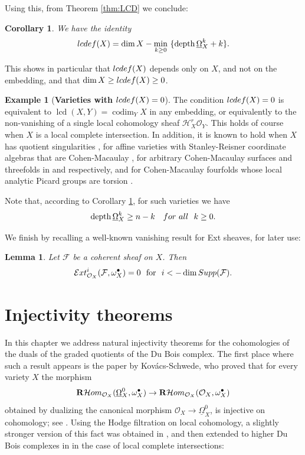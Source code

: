 \documentclass[11pt]{amsart}
\newtheorem{lemma}[equation]{Lemma}
\newtheorem{corollary}[equation]{Corollary}
\theoremstyle{definition}
\newtheorem{example}[equation]{Example}
\theoremstyle{plain}
\newcommand{\E}{\mathcal E}
\newcommand{\F}{\mathcal F}
\renewcommand{\H}{\mathcal H}
\renewcommand{\O}{\mathcal O}
\newcommand{\RHom}{{\bf R} \H om}
\newcommand{\sExt}{\E xt} %
\newcommand{\DB}{\underline{\Omega}} %
\DeclareMathOperator{\lcd}{lcd}
\DeclareMathOperator{\codim}{codim}
\DeclareMathOperator{\depth}{depth}
\begin{document}
Using this, from Theorem \ref{thm:LCD} we conclude:

\begin{corollary}\label{cor:depth-DB-complex}
We have the identity 
$${\rm lcdef} (X) = \dim X -  \underset{k \ge 0}{\min}~ \{ \depth \DB_X^k + k \}.$$
\end{corollary}

This shows in particular that ${\rm lcdef} (X)$ depends only on $X$, and not on the embedding, and that 
 $\dim X \ge {\rm lcdef} (X) \ge 0$.


\begin{example}[{\bf Varieties with ${\rm lcdef}(X)= 0$}]\label{def=0}
The condition ${\rm lcdef}(X)= 0$ is equivalent to $\lcd (X, Y) = \codim_Y X$ in any embedding, or equivalently to the non-vanishing of a single 
local cohomology sheaf $\H^r_X \O_Y$. This holds of course when $X$ is a local complete intersection. In addition, it is known to hold 
when $X$ has quotient singularities \cite[Corollary 11.22]{MP-LC}, for affine varieties with Stanley-Reisner coordinate algebras that are Cohen-Macaulay \cite[Corollary 11.26]{MP-LC}, for arbitrary Cohen-Macaulay surfaces and threefolds in \cite[Remark p.338-339]{Ogus} and 
\cite[Corollary 2.8]{DT} respectively, and for Cohen-Macaulay fourfolds whose local analytic Picard groups are torsion \cite[Theorem 1.3]{DT}.  

Note that, according to Corollary \ref{cor:depth-DB-complex}, for such varieties we have
$$ \depth \DB_X^k \ge n- k \,\,\,\,\,\,{\rm for ~all}\,\,\,\, k \ge 0.$$
\end{example}

\smallskip

We finish  by recalling a well-known vanishing result for Ext sheaves, for later use:

\begin{lemma}\label{lem:vanishing-of-Ext}
Let $\F$ be a coherent sheaf on $X$. Then 
\[\sExt^i_{\O_X}(\F, \omega_X^{\bullet})=0 \text{ \,\,{\rm for} \,\,} i< -\dim {\rm Supp}( \F).\]
\end{lemma}




\section{Injectivity theorems}
In this chapter we address natural injectivity theorems for the cohomologies of the duals of the graded quotients of the Du Bois complex. The  first place where such a result appears is the paper \cite{KS-injectivity} by Kov\'acs-Schwede, who proved that for every variety $X$ the morphism 
\[\RHom_{\O_X} (\DB_X^0,\omega_X^{\bullet})\to \RHom_{\O_X} (\O_X,\omega_X^{\bullet})\]
obtained by dualizing the canonical morphism $\O_X \to \DB_X^0$,  is injective on cohomology; see \cite[Theorem 3.3]{KS-injectivity}. Using the Hodge filtration on local cohomology, a slightly stronger version of this fact was obtained in \cite[Theorem A]{MP-LC}, and then extended to higher Du Bois complexes in \cite[Theorem A]{MP-lci} in the case of local complete intersections:
\end{document}
